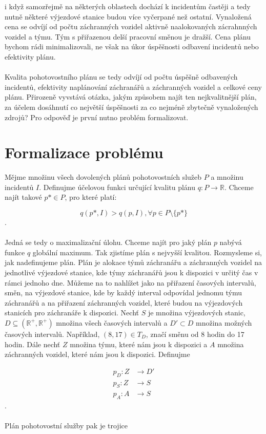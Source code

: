 i když samozřejmě na některých oblastech dochází k incidentům častěji a tedy nutně některé výjezdové stanice budou více vyčerpané než ostatní.
Vynaložená cena se odvíjí od počtu záchranných vozidel aktivně naalokovaných zácrahnných vozidel a týmu. Tým s přiřazenou delší pracovní směnou je dražší.
Cena plánu bychom rádi minimalizovali, ne však na úkor úspěšnosti odbavení incidentů nebo efektivity plánu.
\\\\
Kvalita pohotovostního plánu se tedy odvíjí od počtu úspěšně odbavených incidentů, efektivity naplánování záchranářů a záchranných vozidel a celkové ceny plánu.
Přirozeně vyvstává otázka, jakým způsobem najít ten nejkvalitnější plán, za účelem dosáhnutí co největší úspěšnosti za co nejméně zbytečně vynaložených zdrojů? 
Pro odpověď je první nutno problém formalizovat.

\clearpage

\section{Formalizace problému}

Mějme množinu všech dovolených plánů pohotovostních služeb $P$ a množinu incidentů $I$. Definujme účelovou funkci určující kvalitu plánu $q\colon P \rightarrow \mathbb{R}$.
Chceme najít takové $p* \in P$, pro které platí:

$$
q(p*, I) > q(p, I), \forall p \in P \setminus \{p*\}
$$
.
\\
\\
Jedná se tedy o maximalizační úlohu. Chceme najít pro jaký plán $p$ nabývá funkce $q$ globální maximum. Tak zjistíme plán s nejvyšší kvalitou.
Rozmysleme si, jak nadefinujeme plán. Plán je alokace týmů záchranářu a záchranných vozidel na jednotlivé výjezdové stanice, kde týmy záchranářů jsou k dispozici v určitý čas v rámci jednoho dne.
Můžeme na to nahlížet jako na přiřazení časových intervalů, směn, na výjezdové stanice, kde by každý interval odpovídal jednomu týmu záchranářů a na přiřazení záchranných vozidel,
které budou na výjezdových stanicích pro záchranáře k dispozici.
Nechť $S$ je množina výjezdových stanic, $D \subseteq (\mathbb{R^+}, \mathbb{R^+})$ množina všech časových intervalů a $D' \subset D$ množina možných časových intervalů.
Například, $(8, 17) \in T_D$, značí směnu od 8 hodin do 17 hodin.
Dále nechť $Z$ množina týmu, které nám jsou k dispozici a $A$ množina záchranných vozidel, které nám jsou k dispozici. Definujme

\begin{align}
p_D \colon Z &\rightarrow D' \\
p_S \colon Z &\rightarrow S \\
p_A \colon A &\rightarrow S 
\end{align}
.
\\
\\
Plán pohotovostní služby pak je trojice

